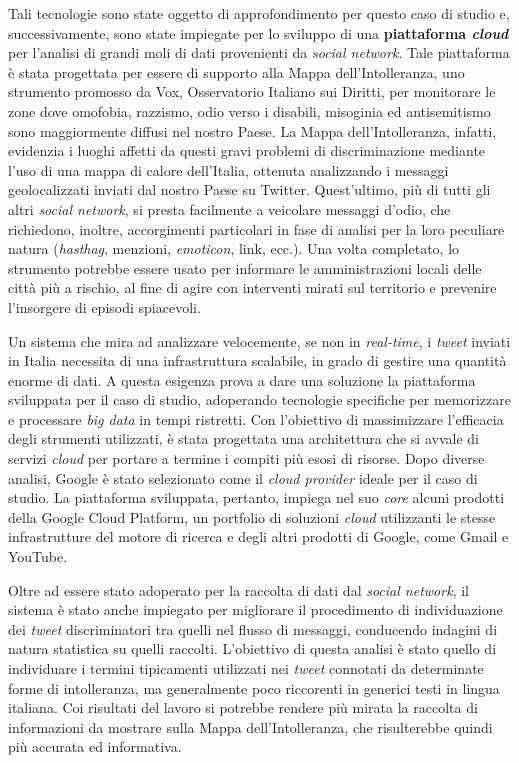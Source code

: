 Tali tecnologie sono state oggetto di approfondimento per questo caso di studio e, successivamente, sono state impiegate per lo sviluppo di una \textbf{piattaforma \textit{cloud}} per l’analisi di grandi moli 
di dati provenienti da \textit{social network}. Tale piattaforma è stata progettata per essere di supporto alla Mappa dell’Intolleranza, uno strumento promosso da Vox, Osservatorio 
Italiano sui Diritti, per monitorare le zone dove omofobia, razzismo, odio verso i disabili, misoginia ed antisemitismo sono maggiormente diffusi
nel nostro Paese. La Mappa dell’Intolleranza, infatti, evidenzia i luoghi affetti da questi gravi problemi di discriminazione mediante l'uso di una mappa di calore 
dell’Italia, ottenuta analizzando i messaggi geolocalizzati inviati dal nostro Paese su Twitter. Quest'ultimo, più di tutti gli altri \textit{social network}, si presta facilmente a veicolare messaggi
d'odio, che richiedono, inoltre, accorgimenti particolari in fase di analisi per la loro peculiare natura (\textit{hasthag}, menzioni, \textit{emoticon}, link, ecc.). 
Una volta completato, lo strumento potrebbe essere usato per informare le amministrazioni locali delle città più a rischio, al fine di agire con interventi mirati sul territorio e
prevenire l'insorgere di episodi spiacevoli.

Un sistema che mira ad analizzare velocemente, se non in \textit{real-time}, i \textit{tweet} inviati in Italia necessita di una infrastruttura scalabile, in grado di gestire una quantità enorme 
di dati. A questa esigenza prova a dare una soluzione la piattaforma sviluppata per il caso di studio, adoperando tecnologie specifiche per memorizzare e 
processare \textit{big data} in tempi ristretti. Con l'obiettivo di massimizzare l'efficacia degli strumenti utilizzati, è stata progettata una architettura che si avvale di servizi \textit{cloud} per portare a termine i compiti più esosi di risorse.
Dopo diverse analisi, Google è stato selezionato 
come il \textit{cloud provider} ideale per il caso di studio. La piattaforma sviluppata, pertanto, impiega nel suo \textit{core} alcuni prodotti della Google Cloud Platform, un portfolio di 
soluzioni \textit{cloud} utilizzanti le stesse infrastrutture del motore di ricerca e degli altri prodotti di Google, come Gmail e YouTube.

Oltre ad essere stato adoperato per la raccolta di dati dal \textit{social network}, il sistema è stato anche impiegato per migliorare il procedimento 
di individuazione dei \textit{tweet} discriminatori tra quelli nel flusso di messaggi, conducendo indagini di natura statistica su quelli raccolti. L’obiettivo di questa analisi è stato quello di individuare
i termini tipicamenti utilizzati nei \textit{tweet} connotati da determinate forme di intolleranza, ma generalmente poco riccorenti in generici testi in lingua italiana. Coi risultati
del lavoro si potrebbe rendere più mirata la raccolta di informazioni da mostrare sulla Mappa dell’Intolleranza, che risulterebbe quindi più accurata ed informativa.

